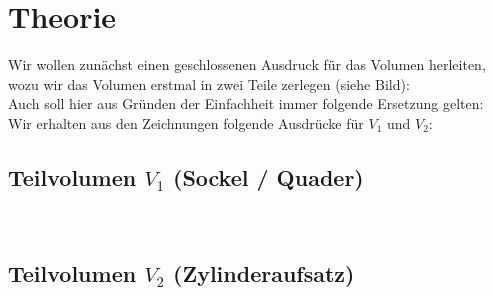 \section{Theorie}
\label{sec:Theorie}

Wir wollen zunächst einen geschlossenen Ausdruck für das Volumen herleiten, wozu wir das Volumen erstmal in zwei Teile zerlegen (siehe Bild):
\\[
    V = V_1 + V_2
\\]

Auch soll hier aus Gründen der Einfachheit immer folgende Ersetzung gelten:
\\[
    A_k' := \frac{A_k}{2} \quad \text{bzw.} \quad D_k' := \frac{D_k}{2}
\\]

Wir erhalten aus den Zeichnungen folgende Ausdrücke für $V_1$ und $V_2$:

\subsection*{Teilvolumen $V_1$ (Sockel / Quader)}
\\[
    \begin{aligned}
        \\V_1 = A_1 \cdot A_9 \cdot B_5
        &- \pi \cdot B_5 (A_3')^2 - \pi \cdot B_5 (A_6')^2
        &- \pi \cdot B_2 (D_3')^2 - \pi (B_5 - B_2) (A_2')^2 \\
        &- \frac{1}{3}\pi \cdot B_3 \left( (A_4')^2 + A_4' A_5' + (A_5')^2 \right) - \pi (B_5 - B_3) (A_5')^2
        &- \pi \cdot B_4 (A_8')^2 - \pi (B_5 - B_4) (A_7')^2
    \end{aligned}
\\]

\subsection*{Teilvolumen $V_2$ (Zylinderaufsatz)}
\\[
    \begin{aligned}
        V_2 = \pi \cdot B_6 (D_1')^2
        &- \pi \cdot B_1 (D_2')^2 - \pi (B_6 - B_1) (A_7')^2 \\
        &- 2 D_4 (D_1' - D_2') B_6 - 2 D_5 (D_1' - D_2') B_7
    \end{aligned}
\\]

\cite{sample}